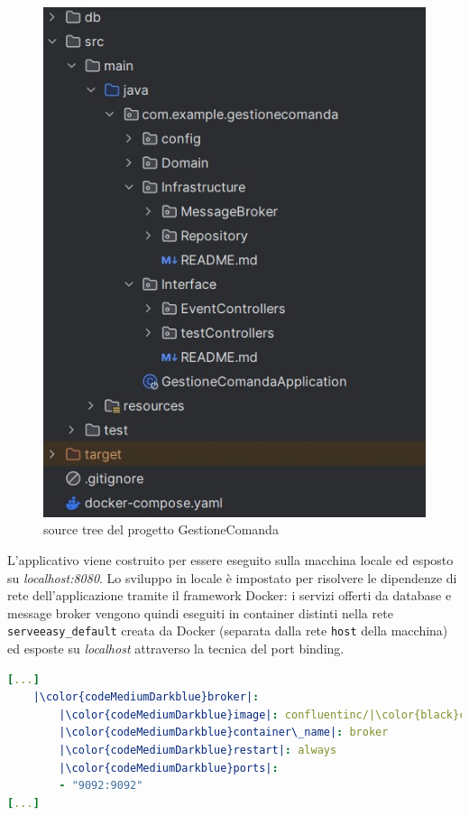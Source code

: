 \begin{figure}[htbp]
	\centering
	\includegraphics[scale=0.50]{iterazione1/images/source tree.jpg}
	\caption{source tree del progetto GestioneComanda
 \label{fig:srctreeGestioneComanda}}
\end{figure}

L'applicativo viene costruito per essere eseguito sulla macchina locale ed esposto su \textit{localhost:8080}. Lo sviluppo in locale è impostato per risolvere le dipendenze di rete dell'applicazione tramite il framework Docker: i servizi offerti da database e message broker vengono quindi eseguiti in container distinti nella rete \texttt{serveeasy\_default} creata da Docker (separata dalla rete \texttt{host} della macchina) ed esposte su \textit{localhost} attraverso la tecnica del port binding.

\begin{lstlisting}[language=yaml, caption={port-binding del servizio \textit{broker} alla voce \textit{ports} (porta\_host:porta\_container) }, label=lst:port-binding]
[...]
	|\color{codeMediumDarkblue}broker|:
		|\color{codeMediumDarkblue}image|: confluentinc/|\color{black}cp-kafka:7.3.0|
		|\color{codeMediumDarkblue}container\_name|: broker
		|\color{codeMediumDarkblue}restart|: always
		|\color{codeMediumDarkblue}ports|:
		- "9092:9092"
[...]
\end{lstlisting}

\clearpage